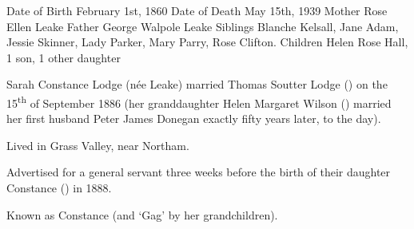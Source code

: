 
Date of Birth 	February 1st, 1860
Date of Death 	May 15th, 1939
Mother 	Rose Ellen Leake
Father 	George Walpole Leake
Siblings 	Blanche Kelsall, Jane Adam, Jessie Skinner, Lady Parker, Mary Parry, Rose Clifton.
Children 	Helen Rose Hall, 1 son, 1 other daughter

Sarah Constance Lodge (n\'{e}e Leake) married Thomas Soutter Lodge () on the 15\textsuperscript{th} of September 1886 (her granddaughter Helen Margaret Wilson () married her first husband Peter James Donegan exactly fifty years later, to the day).

Lived in Grass Valley, near Northam.

Advertised for a general servant three weeks before the birth of their daughter Constance () in 1888.

Known as Constance (and `Gag' by her grandchildren).

\begin{references}



\end{references}
